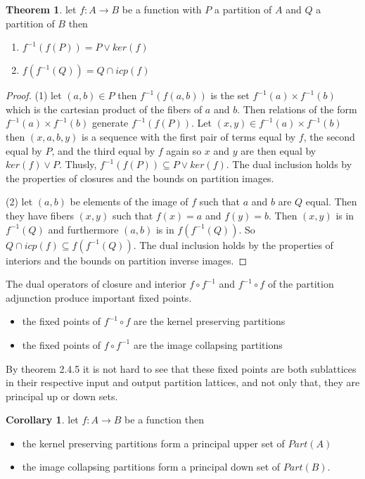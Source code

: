 \documentclass[a4paper,11pt, notitlepage]{report}
\theoremstyle{definition}
\newtheorem{theorem}{Theorem}[section]
\newtheorem{corollary}{Corollary}[section]
\begin{document}
\begin{theorem}
let $f: A \to B$ be a function with $P$ a partition of $A$ and $Q$ a partition of $B$ then

\begin{enumerate}
 \item $f^{-1}(f(P)) = P \vee ker(f)$
 \item $f(f^{-1}(Q)) = Q \cap icp(f)$
\end{enumerate}

\end{theorem}

\begin{proof}
(1) let $(a,b) \in P$ then $f^{-1}(f(a,b))$ is the set $f^{-1}(a) \times f^{-1}(b)$ which is the cartesian product of the fibers of $a$ and $b$. Then relations of the form $f^{-1}(a) \times f^{-1}(b)$ generate $f^{-1}(f(P))$. Let $(x,y) \in f^{-1}(a) \times f^{-1}(b)$ then $(x,a,b,y)$ is a sequence with the first pair of terms equal by $f$, the second equal by $P$, and the third equal by $f$ again so $x$ and $y$ are then equal by $ker(f) \vee P$. Thusly, $f^{-1}(f(P)) \subseteq P \vee ker(f)$. The dual inclusion holds by the properties of closures and the bounds on partition images.

(2) let $(a,b)$ be elements of the image of $f$ such that $a$ and $b$ are $Q$ equal. Then they have fibers $(x,y)$ such that $f(x) = a$ and $f(y) = b$. Then $(x,y)$ is in $f^{-1}(Q)$ and furthermore $(a,b)$ is in $f(f^{-1}(Q))$. So $Q \cap icp(f) \subseteq f(f^{-1}(Q))$. The dual inclusion holds by the properties of interiors and the bounds on partition inverse images.
\end{proof}

The dual operators of closure and interior $f \circ f^{-1}$ and $f^{-1} \circ f$ of the partition adjunction produce important fixed points.

\begin{itemize}
 \item the fixed points of $f^{-1} \circ f$ are the kernel preserving partitions
 \item the fixed points of $f \circ f^{-1}$ are the image collapsing partitions
\end{itemize}

By theorem 2.4.5 it is not hard to see that these fixed points are both sublattices in their respective input and output partition lattices, and not only that, they are principal up or down sets.

\begin{corollary}
let $f: A \to B$ be a function then

\begin{itemize}
 \item the kernel preserving partitions form a principal upper set of $Part(A)$
 \item the image collapsing partitions form a principal down set of $Part(B)$.
\end{itemize}
\end{corollary}
\end{document}
